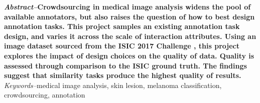 \documentclass[../report.tex]{subfiles}
\begin{document}
{\textbf{\textit{Abstract--}Crowdsourcing in medical image analysis widens the pool of available annotators, but also raises the question of how to best design annotation tasks. This project samples an existing annotation task design, and varies it across the scale of interaction attributes. Using an image dataset sourced from the ISIC 2017 Challenge \cite{ISIC2017Challenge}, this project explores the impact of design choices on the quality of data. Quality is assessed through comparison to the ISIC ground truth. The findings suggest that similarity tasks produce the highest quality of results.}} \\

\textit{Keywords--}medical image analysis, skin lesion, melanoma classification, crowdsourcing, annotation
\end{document}
